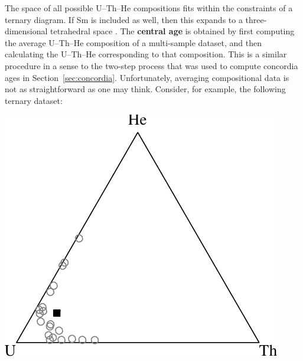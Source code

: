 \begin{refsection}
The space of all possible U--Th--He compositions fits within the
constraints of a ternary diagram. If Sm is included as well, then this
expands to a three-dimensional tetrahedral space
\citep{vermeesch2008a}. The \textbf{central age} is obtained by first
computing the average U--Th--He composition of a multi-sample dataset,
and then calculating the U--Th--He corresponding to that composition.
This is a similar procedure in a sense to the two-step process that
was used to compute concordia ages in Section~\ref{sec:concordia}.
Unfortunately, averaging compositional data is not as straightforward
as one may think. Consider, for example, the following ternary
dataset:\\

\noindent\begin{minipage}[t]{.4\linewidth}
\strut\vspace*{-\baselineskip}\newline
\includegraphics[width=\textwidth]{../figures/ternaryhelium.pdf}\\
\end{minipage}
\begin{minipage}[t]{.6\linewidth}
  \label{fig:ternaryhelium}
\end{minipage}


\end{refsection}
